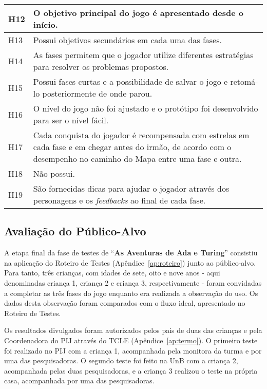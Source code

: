 \begin{table}[H]
\begin{tabular}{|l|p{14cm}|}
H12 & O objetivo principal do jogo é apresentado desde o início. \\ \hline
H13 & Possui objetivos secundários em cada uma das fases.  \\ \hline
H14 & As fases permitem que o jogador utilize diferentes estratégias para resolver os problemas propostos.  \\ \hline
H15 & Possui fases curtas e a possibilidade de salvar o jogo e retomá-lo posteriormente de onde parou. \\ \hline
H16 & O nível do jogo não foi ajustado e o protótipo foi desenvolvido para ser o nível fácil.   \\ \hline
H17 & Cada conquista do jogador é recompensada com estrelas em cada fase e em chegar antes do irmão, de acordo com o desempenho no caminho do Mapa entre uma fase e outra. \\ \hline
H18 & Não possui. \\ \hline
H19 & São fornecidas dicas para ajudar o jogador através dos personagens e os \textit{feedbacks} ao final de cada fase. \\ \hline
\end{tabular}
\end{table}

\subsection{Avaliação do Público-Alvo} \label{ssec:publico-alvo}

A etapa final da fase de testes de “\textbf{As Aventuras de Ada e Turing}” consistiu na aplicação do Roteiro de Testes (Apêndice~\ref{ap:roteiro}) junto ao público-alvo. Para tanto, três crianças, com idades de sete, oito e nove anos - aqui denominadas criança 1, criança 2 e criança 3, respectivamente - foram convidadas a completar as três fases do jogo enquanto era realizada a observação do uso. Os dados desta observação foram comparados com o fluxo ideal, apresentado no Roteiro de Testes.

Os resultados divulgados foram autorizados pelos pais de duas das crianças e pela Coordenadora do \acrshort{PIJ} através do \acrshort{TCLE} (Apêndice~\ref{ap:termo}). O primeiro teste foi realizado no \acrshort{PIJ} com a criança 1, acompanhada pela monitora da turma e por uma das pesquisadoras. O segundo teste foi feito na \acrshort{UnB} com a criança 2, acompanhada pelas duas pesquisadoras, e a criança 3 realizou o teste na própria casa, acompanhada por uma das pesquisadoras.

